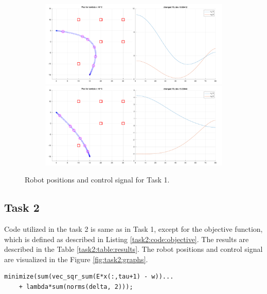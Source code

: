 \begin{figure}[!htb]
\begin{subfigure}
\end{subfigure}
\begin{subfigure}
    \centering
    \includegraphics[width=0.5\linewidth]{part1/figures/task1/1_2.pdf}\hspace{0em}
    \includegraphics[width=0.5\linewidth]{part1/figures/task1/1_3.pdf}
\end{subfigure}
\caption{Robot positions and control signal for Task 1.}
\label{fig:task1:graphs}
\end{figure}

\clearpage
\subsection{Task 2}
Code utilized in the task 2 is same as in Task 1, except for the objective function, which is defined as described in Listing \ref{task2:code:objective}. The results are described in the Table \ref{task2:table:results}. The robot positions and control signal are visualized in the Figure \ref{fig:task2:graphs}.

\begin{lstlisting}[label=task2:code:objective, caption=Objective function used in Task 2., float=!htb]
minimize(sum(vec_sqr_sum(E*x(:,tau+1) - w))...
    + lambda*sum(norms(delta, 2)));
\end{lstlisting}


